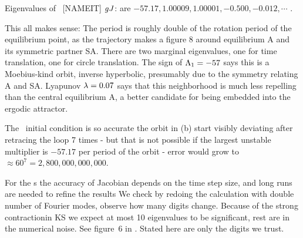 Eigenvalues of \rpo\ [NAMEIT] $g{J}$: are
$ -57.17,  1.00009, 1.00001, -0.500, -0.012, \cdots$ .
%

This all makes sense: The period is roughly double of the rotation period of
the equilibrium point, as the trajectory makes a figure 8 around equilibrium A and
its symmetric partner SA.
 There are two
marginal eigenvalues, one for time translation, one for
circle translation. 
The sign of $\Lambda_{1}=-57$ says this is a Moebius-kind orbit,
inverse hyperbolic, presumably due to the symmetry relating A and SA.
Lyapunov $\lambda=0.07$ says that this neighborhood is much less repelling than
the central equilibrium A, a better candidate for being embedded into the
ergodic attractor.

The \rpo\ initial condition is
so accurate the orbit in (b)
start visibly deviating after retracing the loop 7 times - but that
is not possible if the largest unstable multiplier is 
$-57.17$ per period of the orbit - error would grow to $\approx 60^7
= 2,800,000,000,000$.

For the \rpo s the accuracy of Jacobian depends
on the time step size, and long runs are needed to refine the results
We check by redoing the calculation with double 
number of Fourier modes, observe how many digits
change. 
Because of the strong contractionin KS we expect at most 10 eigenvalues to be
significant, rest are in the numerical noise. See figure~6 in
.
Stated here are only the digits we trust.


